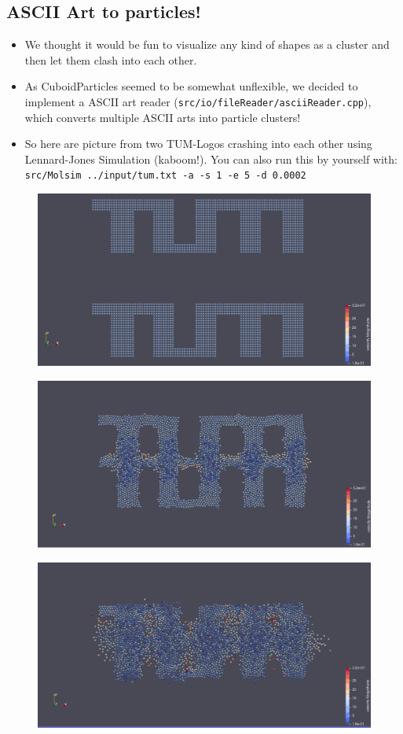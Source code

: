 \documentclass{article}
\begin{document}
\subsection{ASCII Art to particles!}
\begin{itemize}
    \item We thought it would be fun to visualize any kind of shapes as a cluster and then let them clash into each other.
    \item As CuboidParticles seemed to be somewhat unflexible, we decided to implement a ASCII art reader (\verb|src/io/fileReader/asciiReader.cpp|), which converts multiple ASCII arts into particle clusters!
    \item So here are picture from two TUM-Logos crashing into each other using Lennard-Jones Simulation (kaboom!). You can also run this by yourself with: \verb|src/Molsim ../input/tum.txt -a -s 1 -e 5 -d 0.0002|
\end{itemize}
\begin{figure}[H]
        \includegraphics[width=\textwidth]{res/tum1.png}
    \end{figure}
\begin{figure}[H]
        \includegraphics[width=\textwidth]{res/tum2.png}
    \end{figure}
\begin{figure}[H]
        \includegraphics[width=\textwidth]{res/tum3.png}
    \end{figure}
\end{document}

